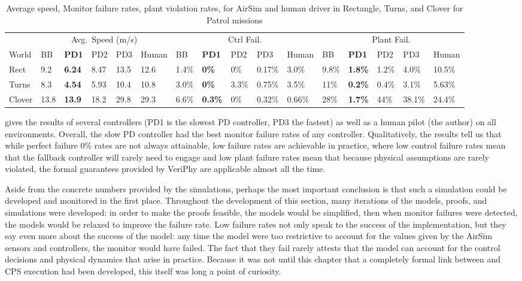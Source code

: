 \documentclass[12pt]{cmuthesis}
\theoremstyle{definition}
\theoremstyle{remark}
\newcommand{\rref}[2][]{\prettyref{#2}}
\newcommand{\VeriPhy}{VeriPhy\xspace}
\begin{document}
\begin{table}
\caption{Average speed, Monitor failure rates, plant violation rates, for AirSim and human driver in Rectangle, Turns, and Clover for Patrol missions}
\label{tab:results}
\centering
\begin{tabular}{l|l|l|l|l|l|l|l|l|l|l|l|l|l|l|l}
\bottomrule        & \multicolumn{5}{|c|}{Avg.\ Speed (m/s)} & \multicolumn{5}{c|}{Ctrl Fail.} & \multicolumn{5}{c|}{Plant Fail.} \\
World   & BB   & \textbf{PD1}   & PD2   & PD3     & Human     & BB     & \textbf{PD1}      & PD2    & PD3    & Human  & BB    & \textbf{PD1} & PD2   & PD3 & Human \\\toprule
Rect    & 9.2  & \textbf{6.24}   & 8.47 &  13.5   & 12.6      & 1.4\%  & \textbf{0\%}      & 0\%    & 0.17\% & 3.0\%  & 9.8\% & \textbf{1.8\%} & 1.2\%  & 4.0\%   & 10.5\%  \\
Turns   & 8.3  & \textbf{4.54}   & 5.93 &  10.4   & 10.8      & 3.0\%  & \textbf{0\%}      & 3.3\%  & 0.75\% & 3.5\%  & 11\%  & \textbf{0.2\%} & 0.4\%  & 3.1\%   & 5.63\%  \\
Clover  & 13.8 & \textbf{13.9}   & 18.2 &  29.8   & 29.3      & 6.6\%  & \textbf{0.3\%}    & 0\%    & 0.32\% & 0.66\% & 28\%  & \textbf{1.7\%} & 44\%   & 38.1\%  & 24.4\%
\end{tabular}
\end{table}
\rref{tab:results} gives the results of several controllers (PD1 is the slowest PD controller, PD3 the fastest) as well as a human pilot (the author) on all environments.
Overall, the slow PD controller had the best monitor failure rates of any controller.
Qualitatively, the results tell us that while perfect failure 0\% rates are not always attainable, low failure rates are achievable in practice, where low control failure rates mean that the fallback controller will rarely need to engage and low plant failure rates mean that because physical assumptions are rarely violated, the formal guarantees provided by \VeriPhy are applicable almost all the time.

Aside from the concrete numbers provided by the simulations, perhaps the most important conclusion is that such a simulation could be developed and monitored in the first place.
Throughout the development of this section, many iterations of the models, proofs, and simulations were developed: in order to make the proofs feasible, the models would be simplified, then when monitor failures were detected, the models would be relaxed to improve the failure rate.
Low failure rates not only speak to the success of the implementation, but they say even more about the success of the model: any time the model were too restrictive to account for the values given by the AirSim sensors and controllers, the monitor would have failed.
The fact that they fail rarely attests that the model can account for the control decisions and physical dynamics that arise in practice.
Because it was not until this chapter that a completely formal link between \dL and CPS execution had been developed, this itself was long a point of curiosity.
\end{document}
